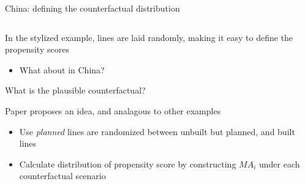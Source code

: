 \documentclass[notes,11pt, aspectratio=169]{beamer}
\newenvironment{wideitemize}{\itemize\addtolength{\itemsep}{10pt}}{\enditemize}
\begin{document}
\begin{frame}{ China: defining the counterfactual distribution}
\begin{columns}[T] %
\begin{column}{.55\textwidth}
  \begin{wideitemize}
  \item In the stylized example, lines are laid randomly, making it easy to define the propensity scores
    \begin{itemize}
    \item What about in China?
    \end{itemize}
  \item What is the plausible counterfactual?
  \item<2-> Paper proposes an idea, and analagous to other examples
    \begin{itemize}
    \item Use \emph{planned} lines are randomized between unbuilt but planned, and built lines
    \item Calculate distribution of propensity score by constructing $MA_{i}$ under each counterfactual scenario
    \end{itemize}
  \end{wideitemize}
\end{column}%
\hfill%
\begin{column}{.45\textwidth}
\end{column}
\end{columns}
\end{frame}
\end{document}
